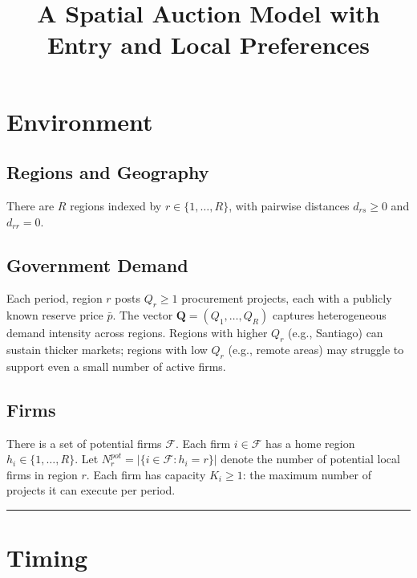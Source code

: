 \documentclass[10pt]{article}
\title{A Spatial Auction Model with Entry and Local Preferences}
\date{}
\begin{document}
\maketitle

\section{Environment}

\subsection*{Regions and Geography}

There are $R$ regions indexed by $r \in \{1, \dots, R\}$, with pairwise distances $d_{rs} \geq 0$ and $d_{rr} = 0$.

\subsection*{Government Demand}

Each period, region $r$ posts $Q_r \geq 1$ procurement projects, each with a publicly known reserve price $\bar{p}$. The vector $\mathbf{Q} = (Q_1, \dots, Q_R)$ captures heterogeneous demand intensity across regions. Regions with higher $Q_r$ (e.g., Santiago) can sustain thicker markets; regions with low $Q_r$ (e.g., remote areas) may struggle to support even a small number of active firms.

\subsection*{Firms}

There is a set of potential firms $\mathcal{F}$. Each firm $i \in \mathcal{F}$ has a home region $h_i \in \{1, \dots, R\}$. Let $N_r^{pot} = |\{i \in \mathcal{F} : h_i = r\}|$ denote the number of potential local firms in region $r$. Each firm has capacity $K_i \geq 1$: the maximum number of projects it can execute per period.

\bigskip\hrule\bigskip

\section{Timing}
\end{document}
